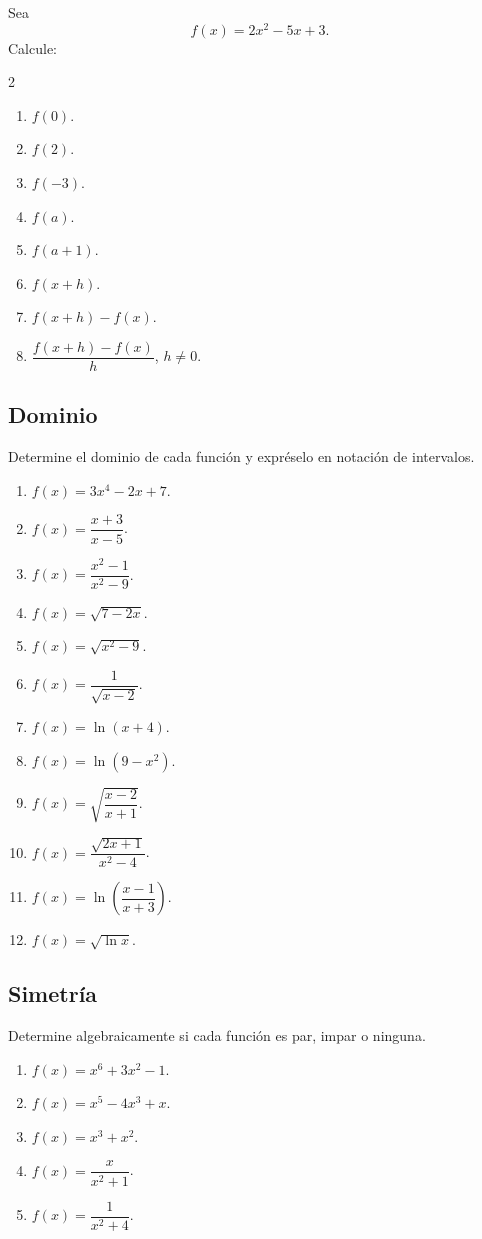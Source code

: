 \documentclass[12pt]{article}
\theoremstyle{remark}
\begin{document}
Sea
\[
f(x)=2x^2-5x+3.
\]
Calcule:
\begin{multicols}{2}
\begin{enumerate}
    \item $f(0)$.
    \item $f(2)$.
    \item $f(-3)$.
    \item $f(a)$.
    \item $f(a+1)$.
    \item $f(x+h)$.
    \item $f(x+h)-f(x)$.
    \item $\dfrac{f(x+h)-f(x)}{h}$, $h\neq0$.
\end{enumerate}
\end{multicols}

\subsection{Dominio}

Determine el dominio de cada función y expréselo en notación de intervalos.

\begin{enumerate}
    \item $f(x)=3x^4-2x+7$.
    \item $f(x)=\dfrac{x+3}{x-5}$.
    \item $f(x)=\dfrac{x^2-1}{x^2-9}$.
    \item $f(x)=\sqrt{7-2x}$.
    \item $f(x)=\sqrt{x^2-9}$.
    \item $f(x)=\dfrac{1}{\sqrt{x-2}}$.
    \item $f(x)=\ln(x+4)$.
    \item $f(x)=\ln(9-x^2)$.
    \item $f(x)=\sqrt{\dfrac{x-2}{x+1}}$.
    \item $f(x)=\dfrac{\sqrt{2x+1}}{x^2-4}$.
    \item $f(x)=\ln\left(\dfrac{x-1}{x+3}\right)$.
    \item $f(x)=\sqrt{\ln x}$.
\end{enumerate}

\subsection{Simetría}

Determine algebraicamente si cada función es par, impar o ninguna.

\begin{enumerate}
    \item $f(x)=x^6+3x^2-1$.
    \item $f(x)=x^5-4x^3+x$.
    \item $f(x)=x^3+x^2$.
    \item $f(x)=\dfrac{x}{x^2+1}$.
    \item $f(x)=\dfrac{1}{x^2+4}$.
\end{enumerate}
\end{document}
